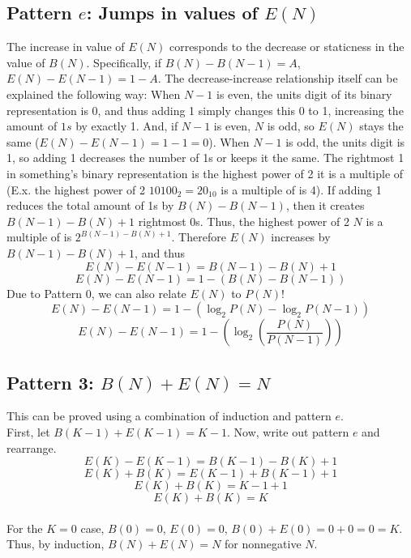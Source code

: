\documentclass{article}
\begin{document}
\subsection*{Pattern $e$: Jumps in values of $E(N)$}
The increase in value of $E(N)$ corresponds to the decrease or staticness in the value of $B(N)$. Specifically, if $B(N)-B(N-1)=A$, $E(N)-E(N-1)=1-A$. The decrease-increase relationship itself can be explained the following way: When $N-1$ is even, the units digit of its binary representation is 0, and thus adding 1 simply changes this 0 to 1, increasing the amount of $1s$ by exactly 1. And, if $N-1$ is even, $N$ is odd, so $E(N)$ stays the same ($E(N)-E(N-1)=1-1=0$). When $N-1$ is odd, the units digit is 1, so adding 1 decreases the number of 1s or keeps it the same. The rightmost 1 in something's binary representation is the highest power of 2 it is a multiple of (E.x. the highest power of 2 $10100_2=20_{10}$ is a multiple of is 4). If adding 1 reduces the total amount of 1s by $B(N)-B(N-1)$, then it creates $B(N-1)-B(N)+1$ rightmost 0s. Thus, the highest power of 2 $N$ is a multiple of is $2^{B(N-1)-B(N)+1}$. Therefore $E(N)$ increases by $B(N-1)-B(N)+1$, and thus 
$$E(N)-E(N-1)=B(N-1)-B(N)+1$$
$$E(N)-E(N-1)=1-(B(N)-B(N-1))$$
Due to Pattern 0, we can also relate $E(N)$ to $P(N)$!
$$E(N)-E(N-1)=1-(\log_2P(N)-\log_2P(N-1))$$
$$E(N)-E(N-1)=1-(\log_2(\frac{P(N)}{P(N-1)}))$$
\subsection*{Pattern 3: $B(N)+E(N)=N$}
This can be proved using a combination of induction and pattern $e$.
\\First, let $B(K-1)+E(K-1)=K-1$. Now, write out pattern $e$ and rearrange.
$$E(K)-E(K-1)=B(K-1)-B(K)+1$$
$$E(K)+B(K)=E(K-1)+B(K-1)+1$$
$$E(K)+B(K)=K-1+1$$
$$E(K)+B(K)=K$$
\\For the $K=0$ case, $B(0)=0$, $E(0)=0$, $B(0)+E(0)=0+0=0=K$. Thus, by induction, $B(N)+E(N)=N$ for nonnegative $N$.
\end{document}
